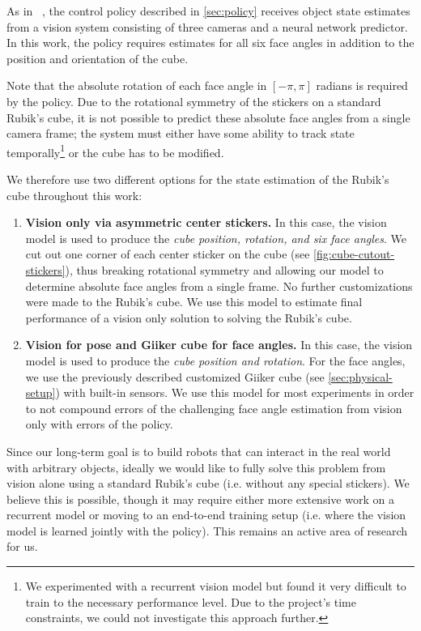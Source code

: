 As in ~\cite{openai2018learning}, the control policy described in \autoref{sec:policy} receives object state estimates from a vision system consisting of three cameras and a neural network predictor. In this work, the policy requires estimates for all six face angles in addition to the position and orientation of the cube.

Note that the absolute rotation of each face angle in $[-\pi, \pi]$ radians is required by the policy. Due to the rotational symmetry of the stickers on a standard Rubik's cube, it is not possible to predict these absolute face angles from a single camera frame; the system must either have some ability to track state temporally\footnote{We experimented with a recurrent vision model but found it very difficult to train to the necessary performance level. Due to the project's time constraints, we could not investigate this approach further.} or the cube has to be modified.

We therefore use two different options for the state estimation of the Rubik's cube throughout this work:
\begin{enumerate}
    \item \textbf{Vision only via asymmetric center stickers.} In this case, the vision model is used to produce the \emph{cube position, rotation, and six face angles}. We cut out one corner of each center sticker on the cube (see \autoref{fig:cube-cutout-stickers}), thus breaking rotational symmetry and allowing our model to determine absolute face angles from a single frame. No further customizations were made to the Rubik's cube. We use this model to estimate final performance of a vision only solution to solving the Rubik's cube.
    \item \textbf{Vision for pose and Giiker cube for face angles.} In this case, the vision model is used to produce the \emph{cube position and rotation}. For the face angles, we use the previously described customized Giiker cube (see \autoref{sec:physical-setup}) with built-in sensors. We use this model for most experiments in order to not compound errors of the challenging face angle estimation from vision only with errors of the policy.
\end{enumerate}


Since our long-term goal is to build robots that can interact in the real world with arbitrary objects, ideally we would like to fully solve this problem from vision alone using a standard Rubik's cube (i.e. without any special stickers). We believe this is possible, though it may require either more extensive work on a recurrent model or moving to an end-to-end training setup (i.e. where the vision model is learned jointly with the policy). This remains an active area of research for us.

